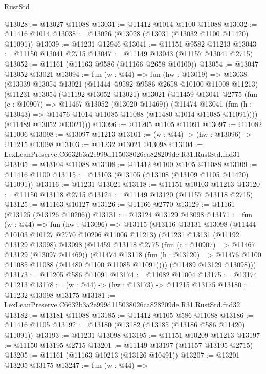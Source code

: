 \begin{lexlean}{RustStd}
\begin{coremodule}
@13028 := @13027 @11088
@13031 := @11412 @1014 @1100 @11088
@13032 := @11416 @1014
@13038 := @13026 (@13028 (@13031 (@13032 @1100 @11420) @11091))
@13039 := @11231 @12946
@13041 := @11151 @9582 @11213
@13043 := @11150 @13041 @2715
@13047 := @11149 @13043 (@11157 @13041 @2715)
@13052 := @11161 (@11163 @9586 (@11166 @2658 @10100))
@13054 := @13047 @13052 @13021
@13094 := fun (w : @44) =>
  fun (hw : @13019) =>
  @13038
    (@13039
      @13054
      @13021
      (@11444 @9582 @9586 @2658 @10100 @11008 @11213)
      (@11231
        @13054
        (@11192 @13052 @13021)
        @13021
        (@11459
          @13041
          @2775
          (fun (c : @10907) => @11467 @13052 (@13020 @11469))
          (@11474
            @13041
            (fun (h : @13043) => @11476 @1014 @11085 @11088 (@11480 @1014 @11085 @11091))))
        (@11489 @13052 @13021)))
@13096 := @11205 @1105 @11091
@13097 := @11082 @11006
@13098 := @13097 @11213
@13101 := (w : @44) -> (hw : @13096) -> @11215 @13098
@13103 := @11232 @13021 @13098
@13104 := LexLeanPreserve.C6632b3a2e999d115038026ca828209de.R31.RustStd.fnd31
@13105 := @13104 @11088
@13108 := @11412 @1100 @1105 @11088
@13109 := @11416 @1100
@13115 := @13103 (@13105 (@13108 (@13109 @1105 @11420) @11091))
@13116 := @11231 @13021
@13118 := @11151 @10103 @11213
@13120 := @11150 @13118 @2715
@13124 := @11149 @13120 (@11157 @13118 @2715)
@13125 := @11163 @10127
@13126 := @11166 @2770
@13129 := @11161 (@13125 (@13126 @10206))
@13131 := @13124 @13129 @13098
@13171 := fun (w : @44) =>
  fun (hw : @13096) =>
  @13115
    (@13116
      @13131
      @13098
      (@11444 @10103 @10127 @2770 @10206 @11006 @11213)
      (@11231
        @13131
        (@11192 @13129 @13098)
        @13098
        (@11459
          @13118
          @2775
          (fun (c : @10907) => @11467 @13129 (@13097 @11469))
          (@11474
            @13118
            (fun (h : @13120) => @11476 @1100 @11085 @11088 (@11480 @1100 @11085 @11091))))
        (@11489 @13129 @13098)))
@13173 := @11205 @586 @11091
@13174 := @11082 @11004
@13175 := @13174 @11213
@13178 := (w : @44) -> (hw : @13173) -> @11215 @13175
@13180 := @11232 @13098 @13175
@13181 := LexLeanPreserve.C6632b3a2e999d115038026ca828209de.R31.RustStd.fnd32
@13182 := @13181 @11088
@13185 := @11412 @1105 @586 @11088
@13186 := @11416 @1105
@13192 := @13180 (@13182 (@13185 (@13186 @586 @11420) @11091))
@13193 := @11231 @13098
@13195 := @11151 @10209 @11213
@13197 := @11150 @13195 @2715
@13201 := @11149 @13197 (@11157 @13195 @2715)
@13205 := @11161 (@11163 @10213 (@13126 @10491))
@13207 := @13201 @13205 @13175
@13247 := fun (w : @44) =>

\end{coremodule}
\end{lexlean}
